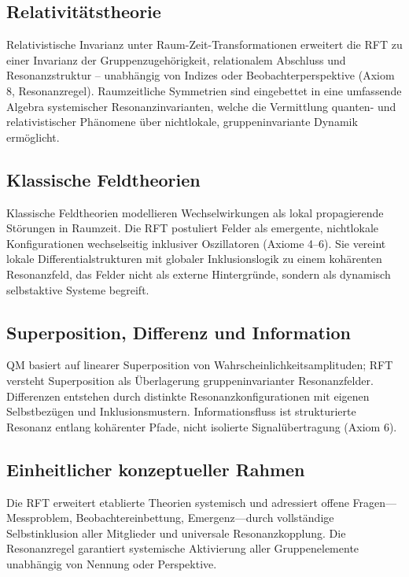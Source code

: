 \documentclass[12pt]{iopart}
\begin{document}
\subsection{Relativitätstheorie}

Relativistische Invarianz unter Raum-Zeit-Transformationen erweitert die RFT zu einer Invarianz der Gruppenzugehörigkeit, relationalem Abschluss und Resonanzstruktur – unabhängig von Indizes oder Beobachterperspektive (Axiom 8, Resonanzregel). Raumzeitliche Symmetrien sind eingebettet in eine umfassende Algebra systemischer Resonanzinvarianten, welche die Vermittlung quanten- und relativistischer Phänomene über nichtlokale, gruppeninvariante Dynamik ermöglicht.

\subsection{Klassische Feldtheorien}

Klassische Feldtheorien modellieren Wechselwirkungen als lokal propagierende Störungen in Raumzeit. Die RFT postuliert Felder als emergente, nichtlokale Konfigurationen wechselseitig inklusiver Oszillatoren (Axiome 4–6). Sie vereint lokale Differentialstrukturen mit globaler Inklusionslogik zu einem kohärenten Resonanzfeld, das Felder nicht als externe Hintergründe, sondern als dynamisch selbstaktive Systeme begreift.

\subsection{Superposition, Differenz und Information}

QM basiert auf linearer Superposition von Wahrscheinlichkeitsamplituden; RFT versteht Superposition als Überlagerung gruppeninvarianter Resonanzfelder. Differenzen entstehen durch distinkte Resonanzkonfigurationen mit eigenen Selbstbezügen und Inklusionsmustern. Informationsfluss ist strukturierte Resonanz entlang kohärenter Pfade, nicht isolierte Signalübertragung (Axiom 6).

\subsection{Einheitlicher konzeptueller Rahmen}

Die RFT erweitert etablierte Theorien systemisch und adressiert offene Fragen—Messproblem, Beobachtereinbettung, Emergenz—durch vollständige Selbstinklusion aller Mitglieder und universale Resonanzkopplung. Die Resonanzregel garantiert systemische Aktivierung aller Gruppenelemente unabhängig von Nennung oder Perspektive.
\end{document}
